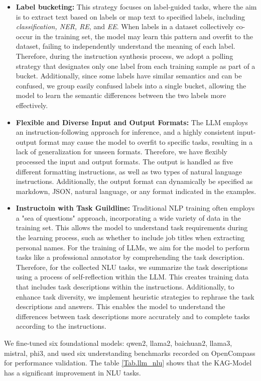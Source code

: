 \documentclass{article}
\begin{document}
\begin{itemize}
    \item \textbf{Label bucketing:} \cite{gui2024iepile}This strategy focuses on label-guided tasks, where the aim is to extract text based on labels or map text to specified labels, including \textit{classification, NER, RE}, and \textit{EE}. When labels in a dataset collectively co-occur in the training set, the model may learn this pattern and overfit to the dataset, failing to independently understand the meaning of each label. Therefore, during the instruction synthesis process, we adopt a polling strategy that designates only one label from each training sample as part of a bucket. Additionally, since some labels have similar semantics and can be confused, we group easily confused labels into a single bucket, allowing the model to learn the semantic differences between the two labels more effectively.
    \item \textbf{Flexible and Diverse Input and Output Formats:} The LLM employs an instruction-following approach for inference, and a highly consistent input-output format may cause the model to overfit to specific tasks, resulting in a lack of generalization for unseen formats. Therefore, we have flexibly processed the input and output formats. The output is handled as five different formatting instructions, as well as two types of natural language instructions. Additionally, the output format can dynamically be specified as markdown, JSON, natural language, or any format indicated in the examples.
    \item \textbf{Instructoin with Task Guildline:} Traditional NLP training often employs a "sea of questions" approach, incorporating a wide variety of data in the training set. This allows the model to understand task requirements during the learning process, such as whether to include job titles when extracting personal names. For the training of LLMs, we aim for the model to perform tasks like a professional annotator by comprehending the task description. Therefore, for the collected NLU tasks, we summarize the task descriptions using a process of self-reflection within the LLM. This creates training data that includes task descriptions within the instructions. Additionally, to enhance task diversity, we implement heuristic strategies to rephrase the task descriptions and answers. This enables the model to understand the differences between task descriptions more accurately and to complete tasks according to the instructions.
\end{itemize}
We fine-tuned six foundational models: qwen2, llama2, baichuan2, llama3, mistral, phi3, and used six understanding benchmarks recorded on OpenCompass for performance validation. The table \ref{Tab.llm_nlu} shows that the KAG-Model has a significant improvement in NLU tasks.
\end{document}
